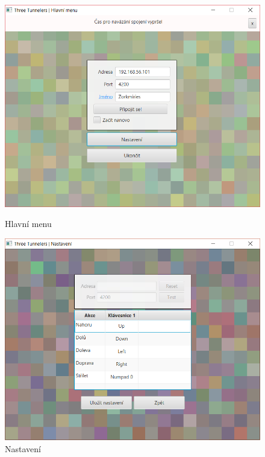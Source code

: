 \documentclass[12pt,a4paper]{article}
\begin{document}
\begin{figure}[h]
    \centering
    \begin{minipage}{0.45\textwidth}
        \includegraphics[width=1\textwidth]{img/01_main_menu.png}
    	\caption{Hlavní menu}
		\label{fig:main_menu}
    \end{minipage}\hfill
    \begin{minipage}{0.45\textwidth}
        \includegraphics[width=1\textwidth]{img/02_settings.png}
        \caption{Nastavení}
		\label{fig:settings}
    \end{minipage}
\end{figure}
\end{document}
